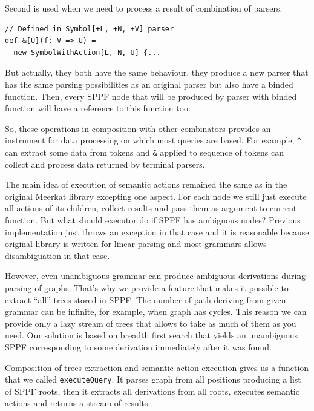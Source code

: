 Second is used when we need to process a result of combination of parsers.
\begin{lstlisting}
// Defined in Symbol[+L, +N, +V] parser
def &[U](f: V => U) = 
  new SymbolWithAction[L, N, U] {...
\end{lstlisting}

But actually, they both have the same behaviour, they produce a new parser that has the same parsing possibilities as an original parser but also have a binded function.
Then, every SPPF node that will be produced by parser with binded function will have a reference to this function too.

So, these operations in composition with other combinators provides an instrument for data processing on which most queries are based. 
For example, \lstinline{^} can extract some data from tokens and \lstinline{&} applied to sequence of tokens can collect and process data returned by terminal parsers.

The main idea of execution of semantic actions remained the same as in the original Meerkat library excepting one aspect.
For each node we still just execute all actions of its children, collect results and pass them as argument to current function.
But what should executor do if SPPF has ambiguous nodes? 
Previous implementation just throws an exception in that case and it is reasonable because original library is written for linear parsing and most grammars allows disambiguation in that case.

However, even unambiguous grammar can produce ambiguous derivations during parsing of graphs.
That's why we provide a feature that makes it possible to extract ``all'' trees stored in SPPF.
The number of path deriving from given grammar can be infinite, for example, when graph has cycles.
This reason we can provide only a lazy stream of trees that allows to take as much of them as you need.
Our solution is based on breadth first search that yields an unambiguous SPPF corresponding to some derivation immediately after it was found.

Composition of trees extraction and semantic action execution gives us a function that we called \lstinline{executeQuery}.
It parses graph from all positions producing a list of SPPF roots, then it extracts all derivations from all roots, executes semantic actions and returns a stream of results.